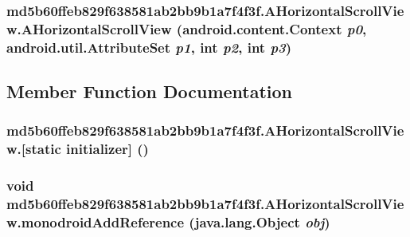 \hypertarget{classmd5b60ffeb829f638581ab2bb9b1a7f4f3f_1_1_a_horizontal_scroll_view_0d9f33e5410003f982e1bddcb71639df}{
\subsubsection[{AHorizontalScrollView}]{\setlength{\rightskip}{0pt plus 5cm}md5b60ffeb829f638581ab2bb9b1a7f4f3f.AHorizontalScrollView.AHorizontalScrollView (android.content.Context {\em p0}, \/  android.util.AttributeSet {\em p1}, \/  int {\em p2}, \/  int {\em p3})}}
\label{classmd5b60ffeb829f638581ab2bb9b1a7f4f3f_1_1_a_horizontal_scroll_view_0d9f33e5410003f982e1bddcb71639df}




\subsection{Member Function Documentation}
\hypertarget{classmd5b60ffeb829f638581ab2bb9b1a7f4f3f_1_1_a_horizontal_scroll_view_d0ee475cb0a3b2ebb173bee6d7bacabb}{
\subsubsection[{[static initializer]}]{\setlength{\rightskip}{0pt plus 5cm}md5b60ffeb829f638581ab2bb9b1a7f4f3f.AHorizontalScrollView.\mbox{[}static initializer\mbox{]} ()}}
\label{classmd5b60ffeb829f638581ab2bb9b1a7f4f3f_1_1_a_horizontal_scroll_view_d0ee475cb0a3b2ebb173bee6d7bacabb}


\hypertarget{classmd5b60ffeb829f638581ab2bb9b1a7f4f3f_1_1_a_horizontal_scroll_view_b9c83144693d24a7290a699e37f9d99d}{
\subsubsection[{monodroidAddReference}]{\setlength{\rightskip}{0pt plus 5cm}void md5b60ffeb829f638581ab2bb9b1a7f4f3f.AHorizontalScrollView.monodroidAddReference (java.lang.Object {\em obj})}}
\label{classmd5b60ffeb829f638581ab2bb9b1a7f4f3f_1_1_a_horizontal_scroll_view_b9c83144693d24a7290a699e37f9d99d}



